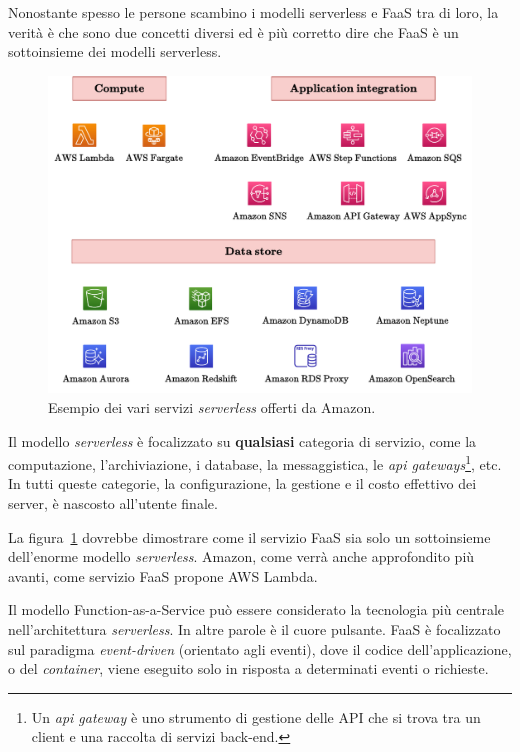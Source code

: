 \documentclass[a4paper]{article}
\begin{document}
	Nonostante spesso le persone scambino i modelli serverless e FaaS tra di loro, la verità è che sono due concetti diversi ed è più corretto dire che FaaS è un sottoinsieme dei modelli serverless.
	\begin{figure}[!htp]
		\centering
		\includegraphics[width=\textwidth]{img/AWS-Serverless-1.pdf}
		\caption{Esempio dei vari servizi \emph{serverless} offerti da Amazon.}
		\label{fig: AWS serverless services}
	\end{figure}
	
	\noindent
	Il modello \emph{serverless} è focalizzato su \textbf{qualsiasi} categoria di servizio, come la computazione, l'archiviazione, i database, la messaggistica, le \emph{api gateways}\footnote{Un \emph{api gateway} è uno strumento di gestione delle API che si trova tra un client e una raccolta di servizi back-end.}, etc. In tutti queste categorie, la configurazione, la gestione e il costo effettivo dei server, è nascosto all'utente finale.
	
	La figura~\ref{fig: AWS serverless services} dovrebbe dimostrare come il servizio FaaS sia solo un sottoinsieme dell'enorme modello \emph{serverless}. Amazon, come verrà anche approfondito più avanti, come servizio FaaS propone AWS Lambda.\newline
	
	Il modello Function-as-a-Service può essere considerato la tecnologia più centrale nell'architettura \emph{serverless}. In altre parole è il cuore pulsante. FaaS è focalizzato sul paradigma \emph{event-driven} (orientato agli eventi), dove il codice dell'applicazione, o del \emph{container}, viene eseguito solo in risposta a determinati eventi o richieste.\newpage
	
\end{document}
